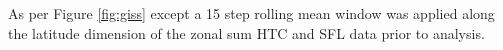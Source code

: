 \label{fig:giss_supp}
As per Figure \ref{fig:giss} except a 15 step rolling mean window was applied along the latitude dimension of the zonal sum HTC and SFL data prior to analysis. 